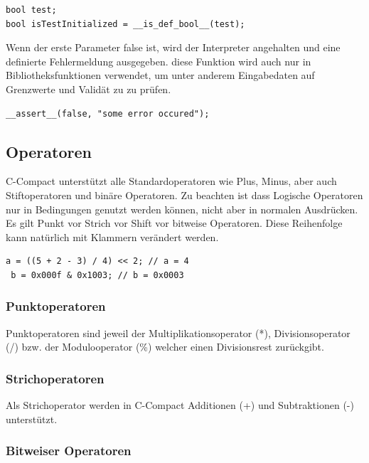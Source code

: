 \begin{lstlisting}[language=CMM]
bool test;
bool isTestInitialized = __is_def_bool__(test);
\end{lstlisting}


Wenn der erste Parameter false ist, wird der Interpreter angehalten und eine definierte Fehlermeldung ausgegeben. diese Funktion wird auch nur in Bibliotheksfunktionen verwendet, um unter anderem Eingabedaten auf Grenzwerte und Valid\"at zu zu pr\"ufen.

\begin{lstlisting}[language=CMM]
__assert__(false, "some error occured");
\end{lstlisting}

\newpage
\subsection{Operatoren}

C-Compact unterst\"utzt alle Standardoperatoren wie Plus, Minus, aber auch Stiftoperatoren und binäre Operatoren. Zu beachten ist dass Logische Operatoren nur in Bedingungen genutzt werden k\"onnen, nicht aber in normalen Ausdr\"ucken. Es gilt Punkt vor Strich vor Shift vor bitweise Operatoren. Diese Reihenfolge kann nat\"urlich mit Klammern ver\"andert werden.

\begin{lstlisting}[language=CMM]
 a = ((5 + 2 - 3) / 4) << 2; // a = 4
 b = 0x000f & 0x1003; // b = 0x0003
\end{lstlisting}

\subsubsection{Punktoperatoren}

Punktoperatoren sind jeweil der Multiplikationsoperator (*), Divisionsoperator (/) bzw. der Modulooperator (\%) welcher einen Divisionsrest zur\"uckgibt.

\subsubsection{Strichoperatoren}

Als Strichoperator werden in C-Compact Additionen (+) und Subtraktionen (-) unterst\"utzt.

\subsubsection{Bitweiser Operatoren}

